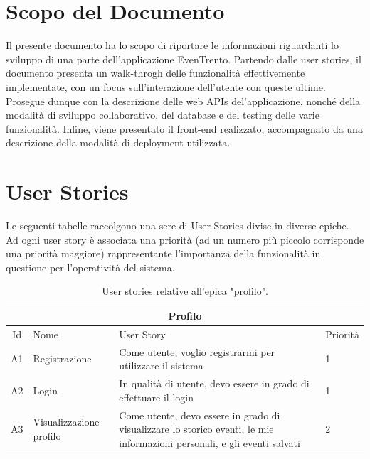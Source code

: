 \documentclass[9pt]{extarticle}
\begin{document}
\customtitle



\tableofcontents
\newpage

\section{Scopo del Documento}

Il presente documento ha lo scopo di riportare le informazioni riguardanti lo
sviluppo di una parte dell'applicazione EvenTrento. Partendo dalle user stories,
il documento presenta un walk-throgh delle funzionalità effettivemente
implementate, con un focus sull'interazione dell'utente con queste ultime.
Prosegue dunque con la descrizione delle web APIs del'applicazione, nonché
della modalità di sviluppo collaborativo, del database e del testing delle varie
funzionalità.
Infine, viene presentato il front-end realizzato, accompagnato da una
descrizione della modalità di deployment utilizzata.

\newpage

\section{User Stories}

Le seguenti tabelle raccolgono una sere di User Stories divise in diverse epiche. Ad ogni user story è associata una priorità (ad un numero più piccolo corrisponde una priorità maggiore) rappresentante l'importanza della funzionalità in questione per l'operatività del sistema.

	
\begin{table}[!htb]
	\centering
	\begin{tabular}{clp{7cm}l} %
		\toprule
		\multicolumn{4}{c}{\textbf{Profilo}}\\ \midrule
		Id & Nome & User Story & Priorità \\ \midrule
		A1  & Registrazione  & Come utente, voglio registrarmi per utilizzare il sistema & 1 \\
		A2  & Login & In qualità di utente, devo essere in grado di effettuare il login & 1 \\
		A3  & Visualizzazione profilo & Come utente, devo essere in grado di visualizzare lo storico eventi, le mie informazioni personali, e gli eventi salvati &  2\\
		\bottomrule
	\end{tabular}
	\caption{User stories relative all'epica "profilo".}
	\label{tab:profili}
\end{table}
\end{document}

